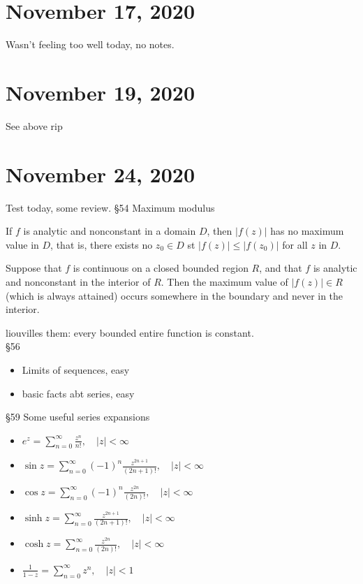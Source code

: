 \section{November 17, 2020}
Wasn't feeling too well today, no notes.
\section{November 19, 2020}
See above rip
\section{November 24, 2020}
Test today, some review.
\orbreak
\Large{\S 54 }\normalsize 
Maximum modulus
\begin{theorem}
If $f$ is analytic and nonconstant in a domain $D$, then $|f(z)|$ has no maximum value in $D$, that is, there exists no $z_0 \in D$ st $|f(z)|\leq |f(z_0)|$ for all $z$ in $D$.
\end{theorem}
\begin{cor}
Suppose that $f$ is continuous on a closed bounded region $R$, and that $f$ is analytic and nonconstant in the interior of $R$. Then the maximum value of $|f(z)| \in R$ (which is always attained) occurs somewhere in the boundary and never in the interior.
\end{cor}
liouvilles them: every bounded entire function is constant.\\
\Large{\S 56 }\normalsize
\begin{itemize}
    \item Limits of sequences, easy
    \item basic facts abt series, easy
\end{itemize}
\Large{\S 59 }\normalsize
Some useful series expansions
\begin{itemize}
    \item $e^{z}=\sum_{n=0}^{\infty} \frac{z^n}{n!},\quad |z|<\infty$
    \item $\sin z=\sum_{n=0}^{\infty} (-1)^n \frac{z^{2n+1}}{(2n+1)!},\quad |z|<\infty$
    \item $\cos z= \sum_{n=0}^{\infty} (-1)^{n}\frac{z^{2n}}{(2n)!}, \quad |z|<\infty$
    \item $\sinh z =\sum_{n=0}^{\infty} \frac{z^{2n+1}}{(2n+1)!},\quad |z|<\infty$ 
    \item $\cosh z= \sum_{n=0}^{\infty} \frac{z^{2n}}{(2n)!},\quad |z|<\infty$ 
    \item $\frac{1}{1-z}=\sum_{n=0}^{\infty} z^n ,\quad |z|<1$
\end{itemize}
